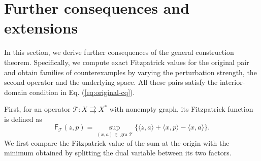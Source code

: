 \documentclass[11pt]{article}
\newcommand{\gra}{\operatorname{gra}}
\newcommand{\pair}[2]{\langle #1,#2\rangle}
\theoremstyle{definition}
\theoremstyle{remark}
\begin{document}
\section{Further consequences and extensions}
\label{sec:corollaries}

In this section, we derive further consequences of the general construction theorem. Specifically, we compute exact Fitzpatrick values for the original pair and obtain families of counterexamples by varying the perturbation strength, the second operator and the underlying space. All these pairs satisfy the interior-domain condition in Eq. (\ref{eq:original-cq}).

First, for an operator $\mathcal T:X\rightrightarrows X^*$ with nonempty graph, its Fitzpatrick function is defined as
\begin{equation}
\mathsf F_{\mathcal T}(z,p)
=\sup_{(x,a)\in\gra\mathcal T}
\{\pair{z}{a}+\pair{x}{p}-\pair{x}{a}\}.
\label{eq:cor-fitzpatrick}
\end{equation}
We first compare the Fitzpatrick value of the sum at the origin with the minimum obtained by splitting the dual variable between its two factors.
\end{document}
